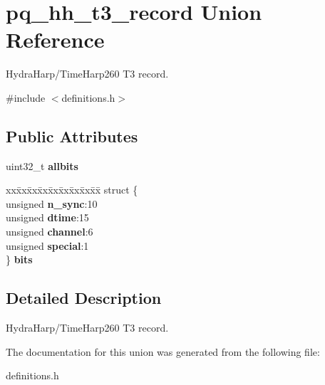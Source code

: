\hypertarget{unionpq__hh__t3__record}{}\section{pq\+\_\+hh\+\_\+t3\+\_\+record Union Reference}
\label{unionpq__hh__t3__record}


Hydra\+Harp/\+Time\+Harp260 T3 record.  




{\ttfamily \#include $<$definitions.\+h$>$}

\subsection*{Public Attributes}
\begin{DoxyCompactItemize}
\item 
\mbox{\label{unionpq__hh__t3__record_a891301a1345ac4270d377d0d525c570c}} 
uint32\+\_\+t {\bfseries allbits}
\item 
\mbox{\label{unionpq__hh__t3__record_aa9ebbd80dc5a109d519ff075d49b3609}} 
\begin{tabbing}
xx\=xx\=xx\=xx\=xx\=xx\=xx\=xx\=xx\=\kill
struct \{\\
\>unsigned {\bfseries n\_sync}:10\\
\>unsigned {\bfseries dtime}:15\\
\>unsigned {\bfseries channel}:6\\
\>unsigned {\bfseries special}:1\\
\} {\bfseries bits}\\

\end{tabbing}\end{DoxyCompactItemize}


\subsection{Detailed Description}
Hydra\+Harp/\+Time\+Harp260 T3 record. 

The documentation for this union was generated from the following file\+:\begin{DoxyCompactItemize}
\item 
definitions.\+h\end{DoxyCompactItemize}
